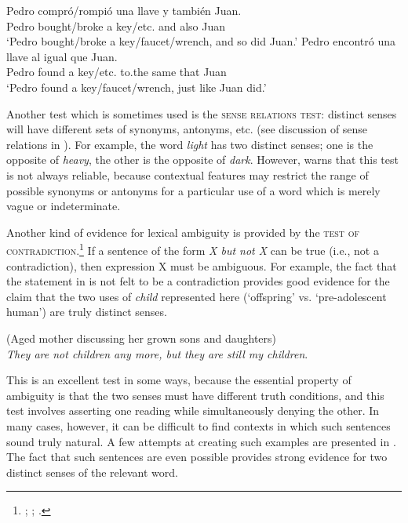 \ea \label{ex:5.9}
\ea  \gll Pedro  compró/rompió  una  llave  y  también  Juan.\\
Pedro  bought/broke  a  key/etc.  and  also  Juan\\
\glt ‘Pedro bought/broke a key/faucet/wrench, and so did Juan.’
\ex \gll  Pedro  encontró  una  llave  al  igual  que  Juan.\\
Pedro  found  a  key/etc.  to.the  same  that  Juan\\
\glt ‘Pedro found a key/faucet/wrench, just like Juan did.’
\z \z


Another test which is sometimes used is the \textsc{sense relations test}: distinct senses will have different sets of synonyms, antonyms, etc. (see discussion of sense relations in ). For example, the word \textit{light} has two distinct senses; one is the opposite of \textit{heavy}, the other is the opposite of \textit{dark}. However, \citet[56-57]{Cruse1986} warns that this test is not always reliable, because contextual features may restrict the range of possible synonyms or antonyms for a particular use of a word which is merely vague or indeterminate.



Another kind of evidence for lexical ambiguity is provided by the \textsc{test of contradiction}.\footnote{\citet{Quine1960}; \citet{ZwickySadock1975}; \citet{Kennedy2011}.} If a sentence of the form \textit{X but not X} can be true (i.e., not a contradiction), then expression X must be ambiguous. For example, the fact that the statement in  is not felt to be a contradiction provides good evidence for the claim that the two uses of \textit{child} represented here (‘offspring’ vs. ‘pre-adolescent human’) are truly distinct senses.


\ea \label{ex:5.10}
(Aged mother discussing her grown sons and daughters)\\
\textit{They are not children any more, but they are still my children}.
\z


This is an excellent test in some ways, because the essential property of ambiguity is that the two senses must have different truth conditions, and this test involves asserting one reading while simultaneously denying the other. In many cases, however, it can be difficult to find contexts in which such sentences sound truly natural. A few attempts at creating such examples are presented in . The fact that such sentences are even possible provides strong evidence for two distinct senses of the relevant word.


